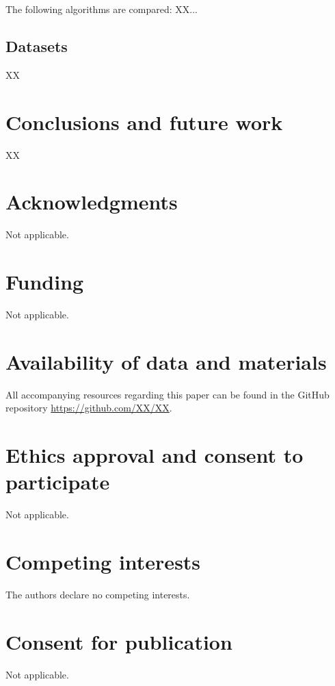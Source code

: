 \documentclass{bmcart}
\begin{document}
The following algorithms  are compared: XX...


\subsection{Datasets}
 XX
 
\section{Conclusions and future work}\label{sec:conclusions}
XX
\begin{backmatter}

 \section*{Acknowledgments}%
Not applicable.

 \section*{Funding}%
Not applicable.


  \section*{Availability of data and materials}%
 All accompanying resources regarding this paper can be found in the GitHub repository \url{https://github.com/XX/XX}. 

\section*{Ethics approval and consent to participate}%
Not applicable. 

\section*{Competing interests}
The authors declare  no competing interests.

\section*{Consent for publication}%
Not applicable. 


\end{backmatter}
\end{document}

